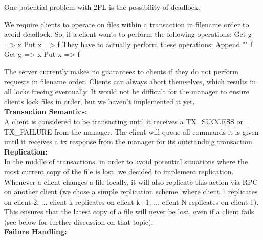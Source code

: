 \documentclass[11pt]{article}
\begin{document}
One potential problem with 2PL is the possibility of deadlock.

We require clients to operate on files within a transaction in filename order to avoid deadlock.
So, if a client wants to perform the following operations: 
	Get g => x
	Put x => f
They have to actually perform these operations:
	Append "" f
	Get g => x
	Put x => f

The server currently makes no guarantees to clients if they do not perform requests in filename order.
Clients can always abort themselves, which results in all locks freeing eventually.
It would not be difficult for the manager to ensure clients lock files in order, but we haven't implemented it yet. \\

\textbf{Transaction Semantics:} \\

A client is considered to be transacting until it receives a TX\_SUCCESS or TX\_FAILURE from the manager.
The client will queue all commands it is given until it receives a tx response from the manager for its outstanding transaction. \\

\textbf{Replication:} \\

In the middle of transactions, in order to avoid potential situations where the most current copy of the file is lost, we decided to implement replication. Whenever a client changes a file locally,
it will also replicate this action via RPC on another client (we chose a simple replication scheme, where client 1 replicates on client 2, ... client k replicates on client k+1, ... client N replicates on client 1).
This ensures that the latest copy of a file will never be lost, even if a client fails (see below for further discussion on that topic). \\

\textbf{Failure Handling:} \\
\end{document}

